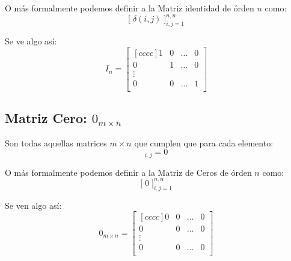 \documentclass[12pt, fleqn]{report}                             %
\theoremstyle{break}                                            %
\newcommand{\BigBrackets}[1] {\Big[ \; #1 \; \Big]}             %
\begin{document}
                O más formalmente podemos definir a la Matriz identidad de órden $n$ como:
                \begin{equation*}
                    \BigBrackets{\delta(i,j)}_{i, j = 1}^{n, n}
                \end{equation*}

                Se ve algo así:
                \begin{equation*}
                    I_n =
                    \begin{bmatrix}[cccc]
                        1 & 0 & \dots & 0   \\
                        0 & 1 & \dots & 0   \\
                        \vdots              \\
                        0 & 0 & \dots & 1   \\
                    \end{bmatrix}
                \end{equation*}



            \vspace{2em}
            \subsection{Matriz Cero: $0_{m \times n}$}

                Son todas aquellas matrices $m \times n$ que cumplen que para cada elemento:
                \begin{equation*}
                    [0]_{i,j} = 0
                \end{equation*}

                O más formalmente podemos definir a la Matriz de Ceros de órden $n$ como:
                \begin{equation*}
                    \BigBrackets{0}_{i, j = 1}^{n, n}
                \end{equation*}

                Se ven algo así:
                \begin{equation*}
                    0_{m \times n} =
                    \begin{bmatrix}[cccc]
                        0 & 0 & \dots & 0   \\
                        0 & 0 & \dots & 0   \\
                        \vdots              \\
                        0 & 0 & \dots & 0   \\
                    \end{bmatrix}
                \end{equation*}
\end{document}
